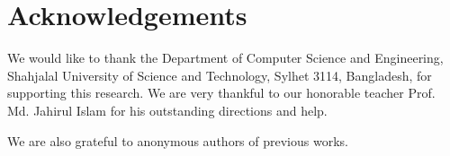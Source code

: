 \documentclass{standalone}
\begin{document}
\chapter*{Acknowledgements}
We would like to thank the Department of Computer Science and Engineering, Shahjalal University of Science and
Technology, Sylhet 3114, Bangladesh, for supporting this research. We are very thankful to our honorable teacher Prof. Md. Jahirul Islam for his outstanding directions and help.  

We are also grateful to anonymous authors of previous works.
\end{document}
